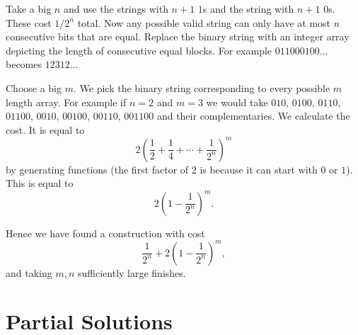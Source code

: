 \documentclass[11pt]{article}
\theoremstyle{definition}
\begin{document}
\begin{solution}[name={Solution by Gabriel Goh}]
	Take a big $n$ and use the strings with $n+1$ $1$s and the string with $n+1$ $0$s. These cost ${1}/{2^n}$ total.
	Now any possible valid string can only have at most $n$ consecutive bits that are equal. Replace the binary string with an integer array depicting the length of consecutive equal blocks. For example $011000100...$ becomes $12312...$
	
	Choose a big $m$. We pick the binary string corresponding to every possible $m$ length array. For example if $n=2$ and $m=3$ we would take $010$, $0100$, $0110$, $01100$, $0010$, $00100$, $00110$, $001100$ and their complementaries. We calculate the cost. It is equal to $$2\left(\frac{1}{2}+\frac{1}{4}+\cdots+\frac{1}{2^n}\right)^m$$ by generating functions (the first factor of 2 is because it can start with $0$ or $1$). This is equal to $$2\left(1-\frac{1}{2^n}\right)^m.$$
	
	Hence we have found a construction with cost $$\frac{1}{2^n}+2\left(1-\frac{1}{2^n}\right)^m,$$ and taking $m,n$ sufficiently large finishes.
\end{solution}


\section{Partial Solutions}

\printsolutions
\end{document}
